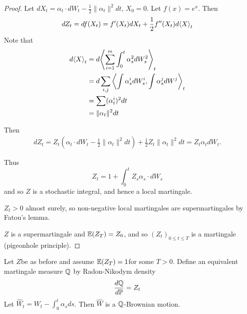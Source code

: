 \begin{proof}
  Let $dX_{t} = \alpha_{t} \cdot dW_{t} - \frac{1}{2} \| \alpha_{t}
  \|^{2} dt$, $X_{0} = 0$. Let $f(x) = e^{x}$.  Then
  \begin{align}
    \label{eq:49}
    dZ_{t} = df(X_{t}) = f'(X_{t}) dX_{t} + \frac{1}{2} f''(X_{t})
    d\IP{ X }_{t}
  \end{align}
  Note that
  \begin{align}
    \label{eq:50}
    d \IP{ X }_{t} &= d \IP{\sum_{i=1}^{m} \int_{0}^{t} \alpha_{s}^{2} dW_{s}^{2}}_{t} \\
    &= d \sum_{i, j} \IP{\int \alpha_{s}^{i} dW^{i}_{s}, \int \alpha_{s}^{j} dW^{j}}_{t} \\
    &= \sum (\alpha_{t}^{i})^{2} dt \\
    &= \| \alpha_{t} \|^{2} dt
  \end{align}

  Then
  \begin{align}
    \label{eq:51}
    dZ_{t} = Z_{t} \left(\alpha_{t} \cdot dW_{t} - \frac{1}{2} \|
      \alpha_{t} \|^{2} dt \right) + \frac{1}{2} Z_{t} \| \alpha_{t}
    \|^{2} dt = Z_{t} \alpha_{t} dW_{t}.
  \end{align}

  Thus
  \begin{equation}
    \label{eq:52}
    Z_{t} = 1 + \int_{0}^{t} Z_{s} \alpha_{s} \cdot dW_{s}
  \end{equation} and so $Z$ is a stochastic integral, and hence a
  local martingale.

  $Z_{t} > 0$ almost surely, so non-negative local martingales are
  supermartingales by Fatou's lemma.

  $Z$ is a supermartingale and $\E{Z_{T}} = Z_{0}$, and so $(Z_{t})_{0
  \leq t \leq T}$ is a martingale (pigeonhole principle).
\end{proof}

\begin{thm}
  \label{defn:continuous_time:15}
  Let $Z$be as before and assume $\E{Z_{T}} = 1$for some $T > 0$.
  Define an equivalent martingale measure $\Q$ by Radon-Nikodym
  density
  \begin{equation}
    \label{eq:53}
    \frac{d\Q}{d\Prob} = Z_{t}
  \end{equation}  Let $\hat W_{t} = W_{t} - \int_{0}^{t} \alpha_{s}
  ds$.  Then $\hat W$ is a $\Q$-Brownian motion.
\end{thm}


